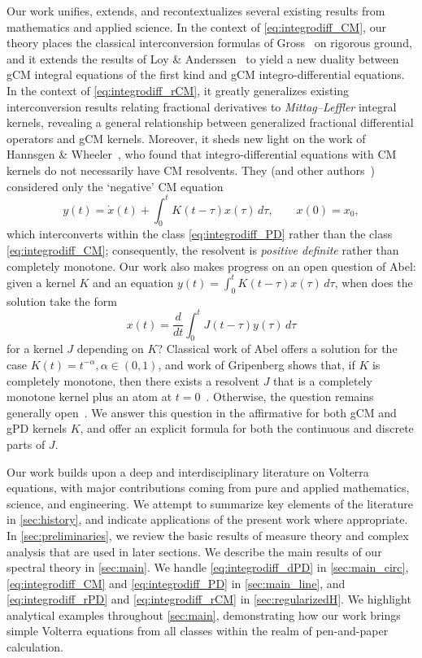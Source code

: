 \documentclass{cams-l} %
\theoremstyle{definition}
\theoremstyle{remark}
\numberwithin{equation}{section}
\begin{document}
Our work unifies, extends, and recontextualizes several existing results from mathematics and applied science. In the context of \ref{eq:integrodiff_CM}, our theory places the classical interconversion formulas of Gross~\cite{gross1968mathematical} on rigorous ground, and it extends the results of Loy \& Anderssen~\cite{loy_anderssen} to yield a new duality between gCM integral equations of the first kind and gCM integro-differential equations. In the context of \ref{eq:integrodiff_rCM}, it greatly generalizes existing interconversion results relating fractional derivatives to \emph{Mittag--Leffler} integral kernels, revealing a general relationship between generalized fractional differential operators and gCM kernels. Moreover, it sheds new light on the work of Hannsgen \& Wheeler~\cite{doi:10.1137/0513067}, who found that integro-differential equations with CM kernels do not necessarily have CM resolvents. They (and other authors~\cite{Gripenberg_Londen_Staffans_1990}) considered only the `negative' CM equation
\begin{equation}\label{eq:negative_CM}
    y(t) = \dot{x}(t) + \int_0^t K(t-\tau) x(\tau)\,d\tau, \qquad x(0)=x_0,
\end{equation}
which interconverts within the class \ref{eq:integrodiff_PD} rather than the class \ref{eq:integrodiff_CM}; consequently, the resolvent is \emph{positive definite} rather than completely monotone. Our work also makes progress on an open question of Abel: given a kernel $K$ and an equation $y(t)=\int_0^tK(t-\tau)x(\tau)\,d\tau$, when does the solution take the form
\[x(t) = \frac{d}{dt}\int_0^t J(t-\tau)y(\tau)\,d\tau\]
for a kernel $J$ depending on $K$? Classical work of Abel offers a solution for the case $K(t) = t^{-\alpha}, \alpha\in(0,1)$, and work of Gripenberg shows that, if $K$ is completely monotone, then there exists a resolvent $J$ that is a completely monotone kernel plus an atom at $t=0$~\cite{Gripenberg1980}. Otherwise, the question remains generally open~\cite{BRUNNER199783}. We answer this question in the affirmative for both gCM and gPD kernels $K$, and offer an explicit formula for both the continuous and discrete parts of $J$.

Our work builds upon a deep and interdisciplinary literature on Volterra equations, with major contributions coming from pure and applied mathematics, science, and engineering. We attempt to summarize key elements of the literature in \cref{sec:history}, and indicate applications of the present work where appropriate. In \cref{sec:preliminaries}, we review the basic results of measure theory and complex analysis that are used in later sections. We describe the main results of our spectral theory in \cref{sec:main}. We handle \ref{eq:integrodiff_dPD} in \cref{sec:main_circ}, \ref{eq:integrodiff_CM} and \ref{eq:integrodiff_PD} in \cref{sec:main_line}, and \ref{eq:integrodiff_rPD} and \ref{eq:integrodiff_rCM} in \cref{sec:regularizedH}. We highlight analytical examples throughout \cref{sec:main}, demonstrating how our work brings simple Volterra equations from all classes within the realm of pen-and-paper calculation.
\end{document}
